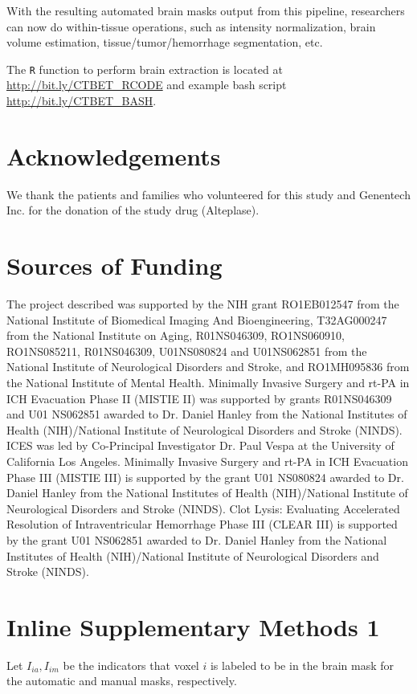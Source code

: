 \documentclass{elsarticle}\usepackage[]{graphicx}\usepackage[]{color}
\begin{document}
With the resulting automated brain masks output from this pipeline, researchers can now do within-tissue operations, such as intensity normalization, brain volume estimation, tissue/tumor/hemorrhage segmentation, etc. 

The \texttt{R} function to perform brain extraction is located at
\url{http://bit.ly/CTBET_RCODE} and example bash script
\url{http://bit.ly/CTBET_BASH}.

\section*{Acknowledgements}
We thank the patients and families who volunteered for this study and Genentech Inc. for the donation of the study drug (Alteplase).

\section*{Sources of Funding}
The project described was supported by the NIH grant RO1EB012547 from the National Institute of Biomedical Imaging And Bioengineering, T32AG000247 from the National Institute on Aging, R01NS046309, RO1NS060910, RO1NS085211, R01NS046309, U01NS080824 and U01NS062851 from the National Institute of Neurological Disorders and Stroke, and RO1MH095836 from the National Institute of Mental Health. Minimally Invasive Surgery and rt-PA in ICH Evacuation Phase II (MISTIE II) was supported by grants R01NS046309 and U01 NS062851 awarded to Dr. Daniel Hanley from the National Institutes of Health (NIH)/National Institute of Neurological Disorders and Stroke (NINDS).  ICES was led by Co-Principal Investigator Dr. Paul Vespa at the University of California Los Angeles. Minimally Invasive Surgery and rt-PA in ICH Evacuation Phase III (MISTIE III) is supported by the grant U01 NS080824 awarded to Dr. Daniel Hanley from the National Institutes of Health (NIH)/National Institute of Neurological Disorders and Stroke (NINDS). Clot Lysis: Evaluating Accelerated Resolution of Intraventricular Hemorrhage Phase III (CLEAR III) is supported by the grant U01 NS062851 awarded to Dr. Daniel Hanley from the National Institutes of Health (NIH)/National Institute of Neurological Disorders and Stroke (NINDS). 

\section*{Inline Supplementary Methods 1}
Let $I_{ia}, I_{im}$ be the indicators that voxel $i$ is labeled to be in the brain mask for the automatic and manual masks, respectively.  
\end{document}
